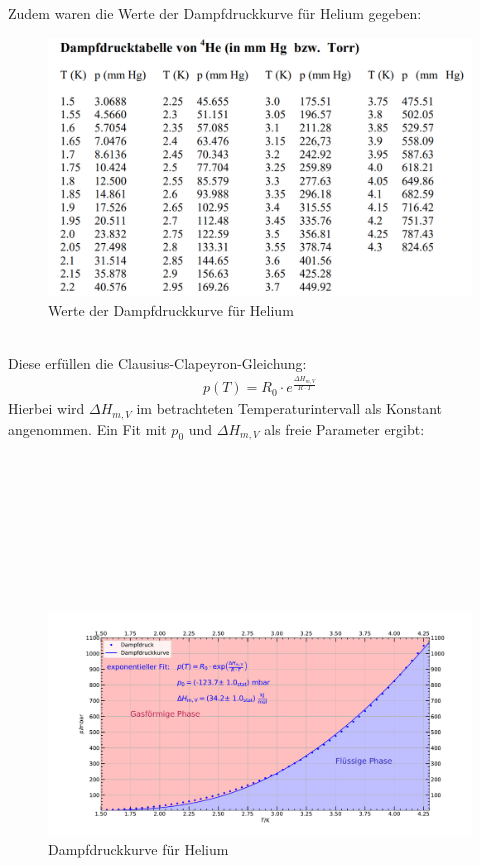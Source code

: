 \documentclass[german,  %
parskip=full,  %
]{scrartcl}
\begin{document}
\newpage
Zudem waren die Werte der Dampfdruckkurve für Helium gegeben:
\\
\begin{figure}[h!]
\centering
\includegraphics[width=\textwidth]{dampf_werte}
\caption{Werte der Dampfdruckkurve für Helium}
\end{figure}
\\
Diese erfüllen die Clausius-Clapeyron-Gleichung:
\begin{align}
p(T)= R_0 \cdot e^{\frac{\Delta H_{m,V}}{R\cdot T}}
\end{align}
Hierbei wird $\Delta H_{m,V}$ im betrachteten Temperaturintervall als Konstant angenommen. Ein Fit mit $p_0$ und $\Delta H_{m,V}$ als freie Parameter ergibt:
\\\\\\\\\\\\\\\\\\
\begin{figure}[h!]
\centering
\includegraphics[width=\textwidth]{Dampfdruckkurve_He4.pdf}
\caption{Dampfdruckkurve für Helium}
\end{figure}
\end{document}
